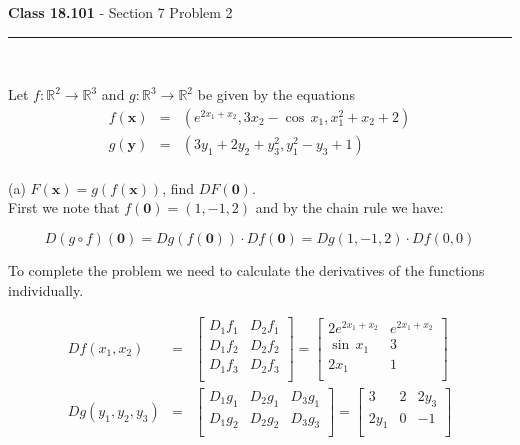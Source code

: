\documentclass[11pt,reqno]{article}
\begin{document}
\begin{flushleft} 
\textbf{Class 18.101} - Section 7 Problem 2\\
\rule{500pt}{1pt}\\
\end{flushleft} 

\noindent Let $f : \mathbb{R}^2 \to \mathbb{R}^3$ and $g : \mathbb{R}^3 \to \mathbb{R}^2$ be given by the equations
\begin{eqnarray*}
f(\textbf{x}) &=& (e^{2 x_1 + x_2}, 3 x_2 - \cos \, x_1, x_1^2 + x_2 + 2) \\
g(\textbf{y}) &=& (3 y_1 + 2 y_2 + y_3^2, y_1^2 - y_3 + 1) \\
\end{eqnarray*}

\noindent (a) $F(\textbf{x}) = g(f(\textbf{x}))$, find $DF(\textbf{0})$. \\

\noindent First we note that $f(\textbf{0}) = (1,-1,2)$ and by the chain rule we have:

\[ D(g \circ f)(\textbf{0})  =  D g(f(\textbf{0})) \cdot D f(\textbf{0}) =  D g(1,-1,2) \cdot D f(0,0) \]

\noindent To complete the problem we need to calculate the derivatives of the functions individually.

\begin{eqnarray*}
D f(x_1,x_2) &=& \left[ \begin{array}{cc}
D_1 f_1 & D_2 f_1\\
D_1 f_2 & D_2 f_2 \\
D_1 f_3 & D_2 f_3 \\
\end{array} \right]  = \left[ \begin{array}{cc}
2 e^{2 x_1 + x_2} & e^{2 x_1 + x_2} \\
\sin \, x_1 & 3 \\
2 x_1 & 1 \\
\end{array} \right] \\
D g(y_1,y_2,y_3) &=& \left[ \begin{array}{ccc}
D_1 g_1 & D_2 g_1 & D_3 g_1\\
D_1 g_2 & D_2 g_2 & D_3 g_3 \\
\end{array} \right]  = \left[ \begin{array}{ccc}
3 & 2 & 2 y_3\\
2 y_1 & 0 & -1\\
\end{array} \right]
\end{eqnarray*}
\end{document}
